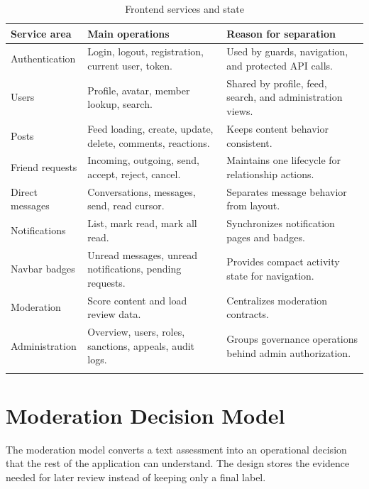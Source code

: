 \begin{longtable}{|m{3.4cm}|m{5.2cm}|m{5.5cm}|}
\hline
\textbf{Service area} & \textbf{Main operations} & \textbf{Reason for separation} \\
\hline
Authentication & Login, logout, registration, current user, token. & Used by guards, navigation, and protected API calls. \\
\hline
Users & Profile, avatar, member lookup, search. & Shared by profile, feed, search, and administration views. \\
\hline
Posts & Feed loading, create, update, delete, comments, reactions. & Keeps content behavior consistent. \\
\hline
Friend requests & Incoming, outgoing, send, accept, reject, cancel. & Maintains one lifecycle for relationship actions. \\
\hline
Direct messages & Conversations, messages, send, read cursor. & Separates message behavior from layout. \\
\hline
Notifications & List, mark read, mark all read. & Synchronizes notification pages and badges. \\
\hline
Navbar badges & Unread messages, unread notifications, pending requests. & Provides compact activity state for navigation. \\
\hline
Moderation & Score content and load review data. & Centralizes moderation contracts. \\
\hline
Administration & Overview, users, roles, sanctions, appeals, audit logs. & Groups governance operations behind admin authorization. \\
\hline
\caption{Frontend services and state}
\end{longtable}

\section{Moderation Decision Model}

The moderation model converts a text assessment into an operational decision that the rest of the application can understand. The design stores the evidence needed for later review instead of keeping only a final label.

